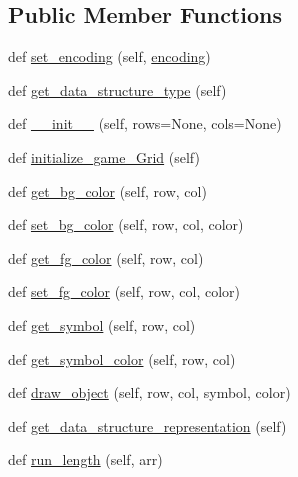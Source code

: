 \subsection*{Public Member Functions}
\begin{DoxyCompactItemize}
\item 
def \hyperlink{classbridges_1_1game__grid_1_1_game_grid_ac31b5450ae5ecbdff9993bd18af8eb5e}{set\+\_\+encoding} (self, \hyperlink{classbridges_1_1game__grid_1_1_game_grid_a0a5df7403a43cdc54045a4999042ad99}{encoding})
\item 
def \hyperlink{classbridges_1_1game__grid_1_1_game_grid_a0a38f422a54e93cfd2816e0051fb8d5a}{get\+\_\+data\+\_\+structure\+\_\+type} (self)
\item 
def \hyperlink{classbridges_1_1game__grid_1_1_game_grid_a9f01ebe1e63708af7e8f1baab430a3cc}{\+\_\+\+\_\+init\+\_\+\+\_\+} (self, rows=None, cols=None)
\item 
def \hyperlink{classbridges_1_1game__grid_1_1_game_grid_aefa77d94a0f5d43d029e5bb9856dd911}{initialize\+\_\+game\+\_\+\+Grid} (self)
\item 
def \hyperlink{classbridges_1_1game__grid_1_1_game_grid_a2d381f584b3738f6302aa4a32d90fafe}{get\+\_\+bg\+\_\+color} (self, row, col)
\item 
def \hyperlink{classbridges_1_1game__grid_1_1_game_grid_a38b9a2b37fb67c41b8feb75df306a60c}{set\+\_\+bg\+\_\+color} (self, row, col, color)
\item 
def \hyperlink{classbridges_1_1game__grid_1_1_game_grid_a0fc16200fc9b1607f39f706ab163a957}{get\+\_\+fg\+\_\+color} (self, row, col)
\item 
def \hyperlink{classbridges_1_1game__grid_1_1_game_grid_a229e94966f4f54b1a1330fc773519d7a}{set\+\_\+fg\+\_\+color} (self, row, col, color)
\item 
def \hyperlink{classbridges_1_1game__grid_1_1_game_grid_a2464ccc9bdbe5ea606ebbe827ab2298c}{get\+\_\+symbol} (self, row, col)
\item 
def \hyperlink{classbridges_1_1game__grid_1_1_game_grid_a7324c15bc6983621ed84964dde173f7f}{get\+\_\+symbol\+\_\+color} (self, row, col)
\item 
def \hyperlink{classbridges_1_1game__grid_1_1_game_grid_a2cce01f3617a91d0107f6522ff12011b}{draw\+\_\+object} (self, row, col, symbol, color)
\item 
def \hyperlink{classbridges_1_1game__grid_1_1_game_grid_acb17afe074d5222b418e922ed5f48ed7}{get\+\_\+data\+\_\+structure\+\_\+representation} (self)
\item 
def \hyperlink{classbridges_1_1game__grid_1_1_game_grid_a80f0ce020baf3d5fe53cbd719fbe78e5}{run\+\_\+length} (self, arr)
\end{DoxyCompactItemize}
